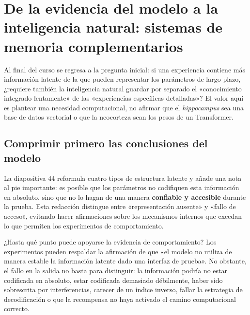\section{De la evidencia del modelo a la inteligencia natural: sistemas de memoria complementarios}

Al final del curso se regresa a la pregunta inicial: si una experiencia contiene más información latente de la que pueden representar los parámetros de largo plazo, ¿requiere también la inteligencia natural guardar por separado el «conocimiento integrado lentamente» de las «experiencias específicas detalladas»? El valor aquí es plantear una necesidad computacional, no afirmar que el \textit{hippocampus} sea una base de datos vectorial o que la neocorteza sean los pesos de un Transformer.

\subsection{Comprimir primero las conclusiones del modelo}

La diapositiva 44 reformula cuatro tipos de estructura latente y añade una nota al pie importante: es posible que los parámetros no codifiquen esta información en absoluto, sino que no lo hagan de una manera \textbf{confiable y accesible} durante la prueba. Esta redacción distingue entre «representación ausente» y «fallo de acceso», evitando hacer afirmaciones sobre los mecanismos internos que excedan lo que permiten los experimentos de comportamiento.


\begin{importantbox}{¿Hasta qué punto puede apoyarse la evidencia de comportamiento?}
Los experimentos pueden respaldar la afirmación de que «el modelo no utiliza de manera estable la información latente dado una interfaz de prueba». No obstante, el fallo en la salida no basta para distinguir: la información podría no estar codificada en absoluto, estar codificada demasiado débilmente, haber sido sobrescrita por interferencias, carecer de un índice inverso, fallar la estrategia de decodificación o que la recompensa no haya activado el camino computacional correcto.
\end{importantbox}


